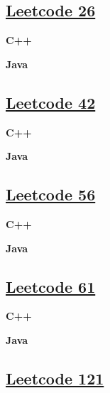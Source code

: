 \subsection{\href{https://leetcode-cn.com/}{Leetcode 26}}\label{app:codelist:leetcode:26}

\textbf{C++}\par


\textbf{Java}\par



\subsection{\href{https://leetcode-cn.com/}{Leetcode 42}}\label{app:codelist:leetcode:42}

\textbf{C++}\par


\textbf{Java}\par



\subsection{\href{https://leetcode-cn.com/}{Leetcode 56}}\label{app:codelist:leetcode:56}

\textbf{C++}\par


\textbf{Java}\par



\subsection{\href{https://leetcode-cn.com/}{Leetcode 61}}\label{app:codelist:leetcode:61}

\textbf{C++}\par


\textbf{Java}\par



\subsection{\href{https://leetcode-cn.com/}{Leetcode 121}}\label{app:codelist:leetcode:121}

